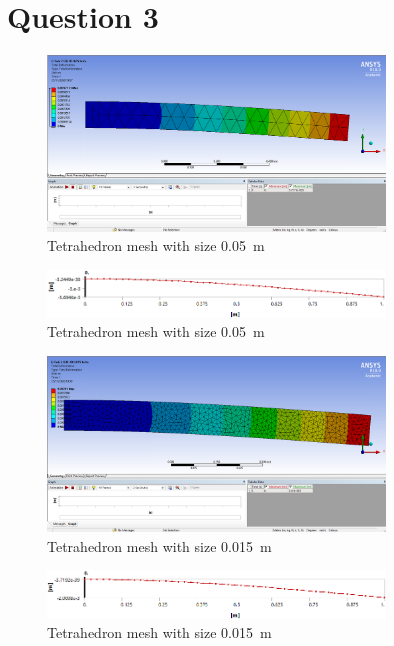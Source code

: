 \documentclass[11pt]{article}
\numberwithin{equation}{section}
\begin{document}
\section{Question 3}
\begin{figure}[H]
  \centering
  \includegraphics[width = 0.8\textwidth]{./img/Q3iDeformation.png}
  \caption{Tetrahedron mesh with size \SI{0.05}{\metre}}
\end{figure}
\begin{figure}[H]
  \centering
  \includegraphics[width = 0.8\textwidth]{./img/Q3iDeflection.png}
  \caption{Tetrahedron mesh with size \SI{0.05}{\metre}}
\end{figure}
\begin{figure}[H]
  \centering
  \includegraphics[width = 0.8\textwidth]{./img/Q3iiDeformation.png}
  \caption{Tetrahedron mesh with size \SI{0.015}{\metre}}
\end{figure}
\begin{figure}[H]
  \centering
  \includegraphics[width = 0.8\textwidth]{./img/Q3iiDeflection.png}
  \caption{Tetrahedron mesh with size \SI{0.015}{\metre}}
\end{figure}
\end{document}
